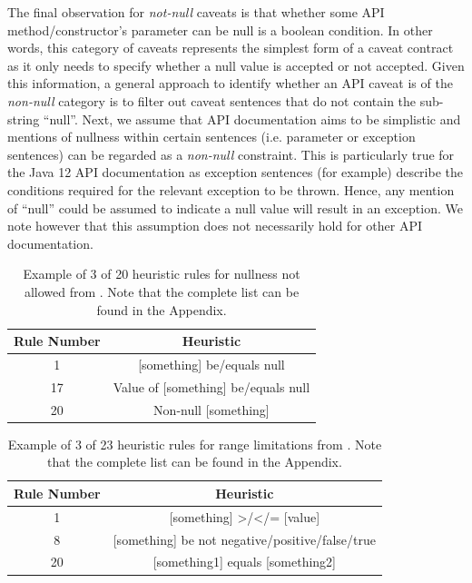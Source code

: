 The final observation for \textit{not-null} caveats is that whether some API method/constructor's parameter can be null is a boolean condition. In other words, this category of caveats represents the simplest form of a caveat contract as it only needs to specify whether a null value is accepted or not accepted. Given this information, a general approach to identify whether an API caveat is of the \textit{non-null} category is to filter out caveat sentences that do not contain the sub-string ``null''. Next, we assume that API documentation aims to be simplistic and mentions of nullness within certain sentences (i.e. parameter or exception sentences) can be regarded as a \textit{non-null} constraint. This is particularly true for the Java 12 API documentation as exception sentences (for example) describe the conditions required for the relevant exception to be thrown. Hence, any mention of ``null'' could be assumed to indicate a null value will result in an exception. We note however that this assumption does not necessarily hold for other API documentation. \\
\clearpage

\begin{table}[h]
	\centering
	\begin{tabular}{|cc|}
		\hline
		Rule Number & Heuristic \\ \hline
		1 & [something] be/equals null \\
		17 & Value of [something] be/equals null \\
		20 & Non-null [something] \\ \hline
	\end{tabular}
	\caption{Example of 3 of 20 heuristic rules for nullness not allowed from \cite{zhou-directive}. Note that the complete list can be found in the Appendix.}
	\label{tab:not-null-heuristic}
\end{table}

\begin{table}[h]
	\centering
	\begin{tabular}{|cc|}
		\hline
		Rule Number & Heuristic \\ \hline
		1 & [something] >/</= [value] \\
		8 & [something] be {not} negative/positive/false/true \\
		20 & [something1] equals [something2] \\ \hline
	\end{tabular}
	\caption{Example of 3 of 23 heuristic rules for range limitations from \cite{zhou-directive}. Note that the complete list can be found in the Appendix.}
	\label{tab:range-limit-heuristic}
\end{table}

